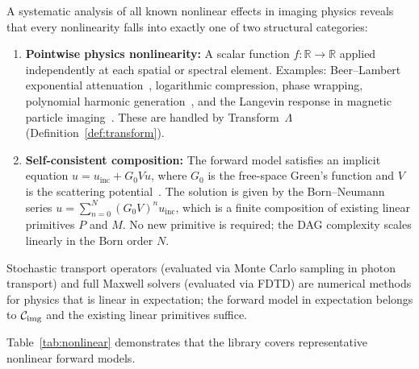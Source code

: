 \documentclass[11pt]{article}
\begin{document}
A systematic analysis of all known nonlinear effects in imaging physics reveals that every nonlinearity falls into exactly one of two structural categories:
\begin{enumerate}
  \item \textbf{Pointwise physics nonlinearity:} A scalar function $f: \mathbb{R} \to \mathbb{R}$ applied independently at each spatial or spectral element. Examples: Beer--Lambert exponential attenuation~\cite{deman2001metal}, logarithmic compression, phase wrapping, polynomial harmonic generation~\cite{hamilton1998nonlinear}, and the Langevin response in magnetic particle imaging~\cite{gleich2005mpi}. These are handled by Transform~$\Lambda$ (Definition~\ref{def:transform}).
  \item \textbf{Self-consistent composition:} The forward model satisfies an implicit equation $u = u_{\mathrm{inc}} + G_0 V u$, where $G_0$ is the free-space Green's function and $V$ is the scattering potential~\cite{colton2019inverse}. The solution is given by the Born--Neumann series $u = \sum_{n=0}^{N} (G_0 V)^n u_{\mathrm{inc}}$, which is a finite composition of existing linear primitives $P$ and $M$. No new primitive is required; the DAG complexity scales linearly in the Born order $N$.
\end{enumerate}
Stochastic transport operators (evaluated via Monte Carlo sampling in photon transport) and full Maxwell solvers (evaluated via FDTD) are numerical methods for physics that is linear in expectation; the forward model in expectation belongs to $\mathcal{C}_{\mathrm{img}}$ and the existing linear primitives suffice.

Table~\ref{tab:nonlinear} demonstrates that the library covers representative nonlinear forward models.
\end{document}
